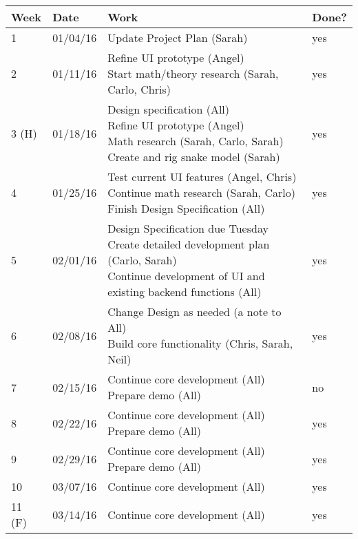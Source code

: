\begin{table}[H]
\centering
\begin{tabular}{|l|l|l|l|}
\hline
Week 	& Date	 		& Work	 		& 	Done?	 \\ \hline
1		& 01/04/16	 	& Update Project Plan (Sarah)		& 	yes	 \\ \hline
2		& 01/11/16	 	& \specialcell{Refine UI prototype (Angel)  \\ Start math/theory research (Sarah, Carlo, Chris)}		& 	yes		 \\ \hline
3 (H)	& 01/18/16	 	& \specialcell{Design specification (All) \\ Refine UI prototype (Angel) \\ Math research (Sarah, Carlo, Sarah) \\ Create and rig snake model (Sarah)}		& 	yes		 \\ \hline
4		& 01/25/16	 	& \specialcell{Test current UI features (Angel, Chris) \\ Continue math research (Sarah, Carlo) \\ Finish Design Specification (All)}		& 	yes		 \\ \hline
5		& 02/01/16	 	& \specialcell{Design Specification due Tuesday \\Create detailed development plan (Carlo, Sarah) \\ Continue development of UI and existing backend functions (All)}	& 	yes		 \\ \hline
6		& 02/08/16	 	& \specialcell{Change Design as needed (a note to All) \\ Build core functionality (Chris, Sarah, Neil)}		& 		yes	 \\ \hline
7		& 02/15/16	 	& \specialcell{Continue core development (All) \\ Prepare demo (All)}		& 	no		 \\ \hline
8		& 02/22/16	 	& \specialcell{Continue core development (All) \\ Prepare demo (All)}	& 		yes	 \\ \hline
9		& 02/29/16	 	& \specialcell{Continue core development (All) \\ Prepare demo (All)}	& 		yes	 \\ \hline
10		& 03/07/16	 	& Continue core development (All)		& 		yes	 \\ \hline
11 (F)	& 03/14/16	 	& Continue core development (All)			& 	yes		 \\ \hline
\end{tabular}
\end{table}

